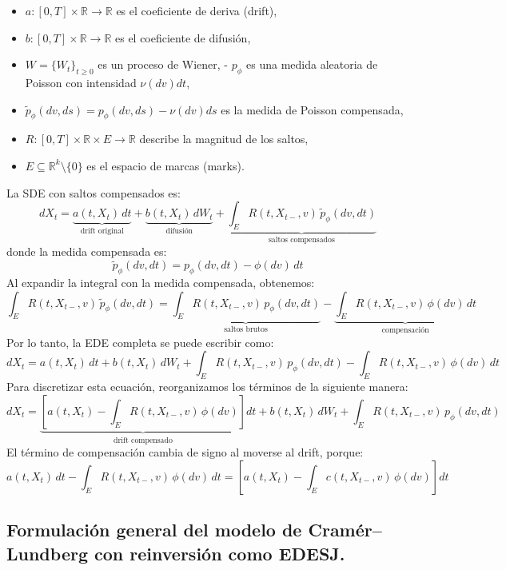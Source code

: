 \documentclass[
  spanish,
  us-letterpaper,
]{scrreprt}
\theoremstyle{plain}
\theoremstyle{plain}
\theoremstyle{definition}
\theoremstyle{remark}
\begin{document}
\begin{itemize}
\item
  \(a: [0,T] \times \mathbb{R} \to \mathbb{R}\) es el coeficiente de
  deriva (drift),
\item
  \(b: [0,T] \times \mathbb{R} \to \mathbb{R}\) es el coeficiente de
  difusión,
\item
  \(W = \{W_t\}_{t \geq 0}\) es un proceso de Wiener, - \(p_\phi\) es
  una medida aleatoria de Poisson con intensidad \(\nu(dv) dt\),
\item
  \(\tilde{p}_\phi(dv, ds) = p_\phi(dv, ds) - \nu(dv) ds\) es la medida
  de Poisson compensada,
\item
  \(R: [0,T] \times \mathbb{R} \times E \to \mathbb{R}\) describe la
  magnitud de los saltos,
\item
  \(E \subseteq \mathbb{R}^k \setminus \{0\}\) es el espacio de marcas
  (marks).
\end{itemize}

La SDE con saltos compensados es:
\[dX_t = \underbrace{a(t, X_t)\,dt}_{\text{drift original}} + \underbrace{b(t, X_t)\,dW_t}_{\text{difusión}} + \underbrace{\int_E R(t, X_{t-}, v)\,\tilde{p}_\phi(dv, dt)}_{\text{saltos compensados}}\]
donde la medida compensada es:
\[\tilde{p}_\phi(dv, dt) = p_\phi(dv, dt) - \phi(dv)\,dt\] Al expandir
la integral con la medida compensada, obtenemos:
\[\int_E R(t, X_{t-}, v)\,\tilde{p}_\phi(dv, dt) = \underbrace{\int_E R(t, X_{t-}, v)\,p_\phi(dv, dt)}_{\text{saltos brutos}} - \underbrace{\int_E R(t, X_{t-}, v)\,\phi(dv)\,dt}_{\text{compensación}}\]
Por lo tanto, la EDE completa se puede escribir como:
\[dX_t = a(t, X_t)\,dt + b(t, X_t)\,dW_t + \int_E R(t, X_{t-}, v)\,p_\phi(dv, dt) - \int_E R(t, X_{t-}, v)\,\phi(dv)\,dt\]
Para discretizar esta ecuación, reorganizamos los términos de la
siguiente manera:
\[dX_t = \underbrace{\left[a(t, X_t) - \int_E R(t, X_{t-}, v)\,\phi(dv)\right]}_{\text{drift compensado}} dt + b(t, X_t)\,dW_t + \int_E R(t, X_{t-}, v)\,p_\phi(dv, dt)\]
El término de compensación cambia de signo al moverse al drift, porque:
\[a(t, X_t)\,dt - \int_E R(t, X_{t-}, v)\,\phi(dv)\,dt = \left[a(t, X_t) - \int_E c(t, X_{t-}, v)\,\phi(dv)\right] dt\]

\subsection{Formulación general del modelo de Cramér--Lundberg con
reinversión como
EDESJ.}\label{formulaciuxf3n-general-del-modelo-de-cramuxe9rlundberg-con-reinversiuxf3n-como-edesj.}
\end{document}
